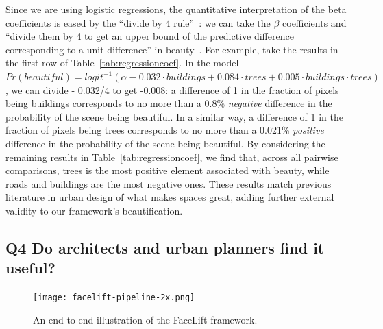 Since we are using logistic regressions, the quantitative interpretation of the beta coefficients is eased by the ``divide by 4 rule''~\cite{vaughn2008data}: we can take the $\beta$ coefficients and ``divide them by 4 to get an upper bound of the predictive difference corresponding to a unit difference'' in beauty~\cite{vaughn2008data}. For example, take the results in the first row of Table~\ref{tab:regressioncoef}. In the model $Pr(beautiful) = logit^{-1}(\alpha - 0.032 \cdot buildings + 0.084 \cdot trees + 0.005 \cdot  buildings \cdot trees)$, we can divide - 0.032/4 to get -0.008: a difference of 1 in the fraction of pixels being buildings corresponds to no more than a 0.8\% \emph{negative} difference in the probability of the scene being beautiful. In a similar way, a difference of 1 in the fraction of pixels being trees corresponds to no more than a 0.021\% \emph{positive} difference in the probability of the scene being beautiful. By considering the remaining results in Table~\ref{tab:regressioncoef}, we find that, across all pairwise comparisons, trees is the most positive element associated with beauty, while roads and buildings are the most negative ones. These results match previous literature in urban design of what makes spaces great, adding further external validity to our framework's beautification. 




\subsection{Q4 Do architects and urban planners find it useful?}

\begin{figure}[ht]
    \centering
    \texttt{[image: facelift-pipeline-2x.png]}
    \caption{An end to end illustration of the FaceLift framework.}
    \label{fig:framework}
\end{figure}


\begin{table}[t!]
    \centering
    \caption{Urban experts polled about the extent to which an interactive map of ``FaceLifted'' scenes promotes: (a) decision making; (b) citizen participation in urban planning; and (c) promotion of green cities}
    \label{tab:useCases}
    \vspace{-10mm}
\end{table}


